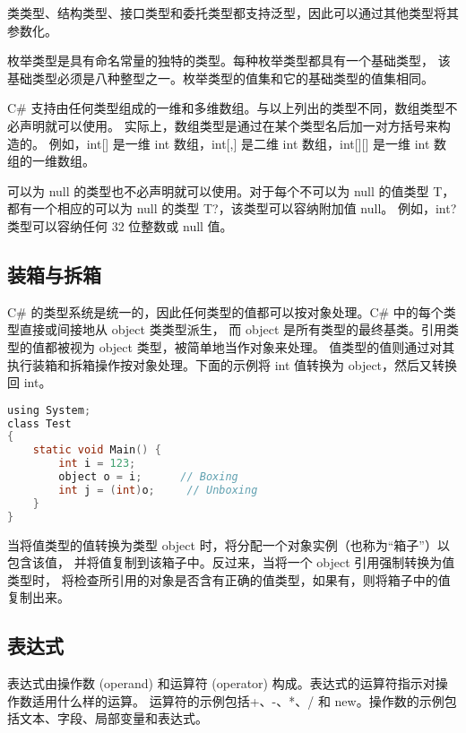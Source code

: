 类类型、结构类型、接口类型和委托类型都支持泛型，因此可以通过其他类型将其参数化。

枚举类型是具有命名常量的独特的类型。每种枚举类型都具有一个基础类型，
该基础类型必须是八种整型之一。枚举类型的值集和它的基础类型的值集相同。

C\# 支持由任何类型组成的一维和多维数组。与以上列出的类型不同，数组类型不必声明就可以使用。
实际上，数组类型是通过在某个类型名后加一对方括号来构造的。
例如，int[] 是一维 int 数组，int[,] 是二维 int 数组，int[][] 是一维 int 数组的一维数组。

可以为 null 的类型也不必声明就可以使用。对于每个不可以为 null 的值类型 T，
都有一个相应的可以为 null 的类型 T?，该类型可以容纳附加值 null。
例如，int? 类型可以容纳任何 32 位整数或 null 值。

\subsection{装箱与拆箱}
C\# 的类型系统是统一的，因此任何类型的值都可以按对象处理。C\# 中的每个类型直接或间接地从 object 类类型派生，
而 object 是所有类型的最终基类。引用类型的值都被视为 object 类型，被简单地当作对象来处理。
值类型的值则通过对其执行装箱和拆箱操作按对象处理。下面的示例将 int 值转换为 object，然后又转换回 int。

\begin{lstlisting}[language=C]
using System;
class Test
{
    static void Main() {
        int i = 123;
        object o = i;      // Boxing
        int j = (int)o;     // Unboxing
    }
}
\end{lstlisting}

当将值类型的值转换为类型 object 时，将分配一个对象实例（也称为“箱子”）以包含该值，
并将值复制到该箱子中。反过来，当将一个 object 引用强制转换为值类型时，
将检查所引用的对象是否含有正确的值类型，如果有，则将箱子中的值复制出来。

\subsection{表达式}
表达式由操作数 (operand) 和运算符 (operator) 构成。表达式的运算符指示对操作数适用什么样的运算。
运算符的示例包括+、-、*、/ 和 new。操作数的示例包括文本、字段、局部变量和表达式。

